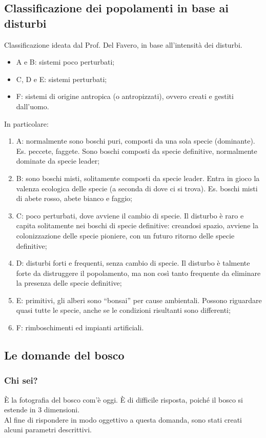 \subsection{Classificazione dei popolamenti in base ai disturbi}
Classificazione ideata dal Prof. Del Favero, in base all'intensità dei disturbi.
\begin{itemize}[nosep]
    \item A e B: sistemi poco perturbati;
    \item C, D e E: sistemi perturbati;
    \item F: sistemi di origine antropica (o antropizzati), ovvero creati e gestiti dall'uomo.
\end{itemize}
In particolare:
\begin{enumerate}[nosep]
    \item A: normalmente sono boschi puri, composti da una sola specie (dominante). Es. peccete, faggete. Sono boschi composti da specie definitive, normalmente dominate da specie leader;
    \item B: sono boschi misti, solitamente composti da specie leader. Entra in gioco la valenza ecologica delle specie (a seconda di dove ci si trova). Es. boschi misti di abete rosso, abete bianco e faggio;
    \item C: poco perturbati, dove avviene il cambio di specie. Il disturbo è raro e capita solitamente nei boschi di specie definitive: creandosi spazio, avviene la colonizzazione delle specie pioniere, con un futuro ritorno delle specie definitive;
    \item D: disturbi forti e frequenti, senza cambio di specie. Il disturbo è talmente forte da distruggere il popolamento, ma non così tanto frequente da eliminare la presenza delle specie definitive;
    \item E: primitivi, gli alberi sono ``bonsai'' per cause ambientali. Possono riguardare quasi tutte le specie, anche se le condizioni risultanti sono differenti;
    \item F: rimboschimenti ed impianti artificiali.
\end{enumerate}
\subsection{Le domande del bosco}
\subsubsection{Chi sei?}
È la fotografia del bosco com'è oggi. È di difficile risposta, poiché il bosco si estende in 3 dimensioni.\\
Al fine di rispondere in modo oggettivo a questa domanda, sono stati creati alcuni parametri descrittivi.
